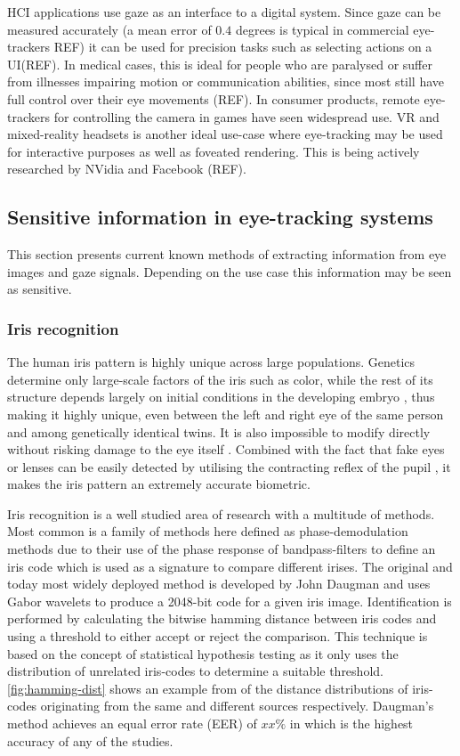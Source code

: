 HCI applications use gaze as an interface to a digital system. Since gaze can be measured accurately (a mean error of $0.4$ degrees is typical in commercial eye-trackers REF) it can be used for precision tasks such as selecting actions on a UI(REF). In medical cases, this is ideal for people who are paralysed or suffer from illnesses impairing motion or communication abilities, since most still have full control over their eye movements (REF). In consumer products, remote eye-trackers for controlling the camera in games have seen widespread use. VR and mixed-reality headsets is another ideal use-case where eye-tracking may be used for interactive purposes as well as foveated rendering. This is being actively researched by NVidia and Facebook (REF).

\subsection{Sensitive information in eye-tracking systems}
This section presents current known methods of extracting information from eye images and gaze signals. Depending on the use case this information may be seen as sensitive.

\subsubsection{Iris recognition}
The human iris pattern is highly unique across large populations. Genetics determine only large-scale factors of the iris such as color, while the rest of its structure depends largely on initial conditions in the developing embryo \cite{kronfeldCHAPTERGrossAnatomy1962}, thus making it highly unique, even between the left and right eye of the same person and among genetically identical twins. It is also impossible to modify directly without risking damage to the eye itself \parencite{DAUGMAN_IRIS_ORIG}. Combined with the fact that fake eyes or lenses can be easily detected by utilising the contracting reflex of the pupil \parencite{DAUGMAN_IRIS_ORIG}, it makes the iris pattern an extremely accurate biometric. 

Iris recognition is a well studied area of research with a multitude of methods. Most common is a family of methods here defined as phase-demodulation methods due to their use of the phase response of bandpass-filters to define an iris code which is used as a signature to compare different irises. The original and today most widely deployed method is developed by John Daugman and uses Gabor wavelets to produce a 2048-bit code for a given iris image\parencite{daugmanHighConfidenceVisual1993}. Identification is performed by calculating the bitwise hamming distance between iris codes and using a threshold to either accept or reject the comparison. This technique is based on the concept of statistical hypothesis testing as it only uses the distribution of unrelated iris-codes to determine a suitable threshold. \cref{fig:hamming-dist} shows an example from \parencite{daugmanHighConfidenceVisual1993} of the distance distributions of iris-codes originating from the same and different sources respectively. Daugman's method achieves an equal error rate (EER) of $xx\%$ in \parencite{daugman2007new} which is the highest accuracy of any of the studies.

